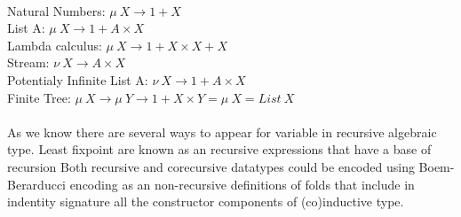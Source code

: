 \begin{definition}
\begin{definition}
\begin{definition}
\begin{definition}
  \paragraph{}
  Natural Numbers: $\mu\ X \rightarrow 1 + X$\\
  List A: $\mu\ X \rightarrow 1 + A \times X$\\
  Lambda calculus: $\mu\ X \rightarrow 1 + X \times X + X$\\
  Stream: $\nu\ X \rightarrow A \times X$\\
  Potentialy Infinite List A: $\nu\ X \rightarrow 1 + A \times X$\\
  Finite Tree: $\mu\ X \rightarrow \mu\ Y \rightarrow 1 + X \times Y = \mu\ X = List\ X$\\

  \paragraph{}
  As we know there are several ways to appear for variable in recursive algebraic type.
  Least fixpoint are known as an recursive expressions that have a base of recursion
  Both recursive and corecursive datatypes could be encoded using Boem-Berarducci encoding
  as an non-recursive definitions of folds that include in indentity signature all the
  constructor components of (co)inductive type.


\end{definition}
\end{definition}
\end{definition}
\end{definition}
